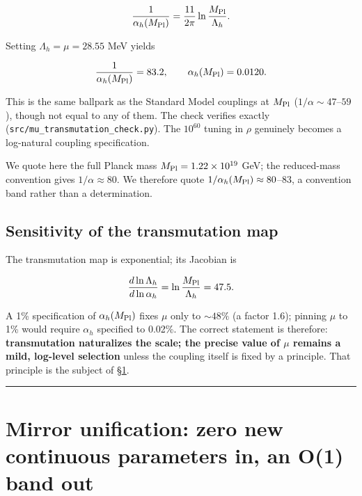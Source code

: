 \documentclass[preprint,12pt]{elsarticle}
\begin{document}
\begin{equation}\frac{1}{\alpha_h(M_{\rm Pl})} = \frac{11}{2\pi} \ln\frac{M_{\rm Pl}}{\Lambda_h}.\end{equation}

Setting \(\Lambda_h = \mu = 28.55\) MeV yields

\begin{equation}\frac{1}{\alpha_h(M_{\rm Pl})} = 83.2, \qquad \alpha_h(M_{\rm Pl}) = 0.0120.\end{equation}

This is the same ballpark as the Standard Model couplings at
\(M_{\rm Pl}\) (\(1/\alpha \sim 47\)--\(59\)), though not equal to any
of them. The check verifies exactly
(\texttt{src/\allowbreak mu\_\allowbreak transmutation\_\allowbreak check.\allowbreak py}). The \(10^{60}\) tuning in
\(\rho\) genuinely becomes a log-natural coupling specification.

We quote here the full Planck mass \(M_{\rm Pl} = 1.22\times10^{19}\)
GeV; the reduced-mass convention gives \(1/\alpha \approx 80\). We
therefore quote \(1/\alpha_h(M_{\rm Pl}) \approx 80\)--\(83\), a
convention band rather than a determination.

\subsection{Sensitivity of the transmutation map}\label{sec-2-2}

The transmutation map is exponential; its Jacobian is

\begin{equation}\frac{d\ln\Lambda_h}{d\ln\alpha_h} = \ln\frac{M_{\rm Pl}}{\Lambda_h} = 47.5.\end{equation}

A 1\% specification of \(\alpha_h(M_{\rm Pl})\) fixes \(\mu\) only to
\(\sim 48\%\) (a factor 1.6); pinning \(\mu\) to 1\% would require
\(\alpha_h\) specified to 0.02\%. The correct statement is therefore:
\textbf{transmutation naturalizes the scale; the precise value of
\(\mu\) remains a mild, log-level selection} unless the coupling itself
is fixed by a principle. That principle is the subject of §\ref{sec-3}.

\begin{center}\rule{0.5\linewidth}{0.5pt}\end{center}

\section{Mirror unification: zero new continuous parameters in, an O(1)
band out}\label{sec-3}
\end{document}
